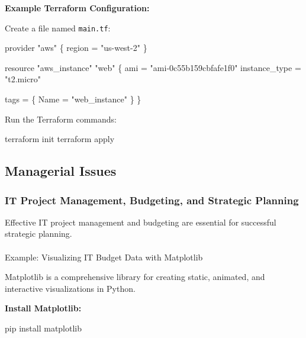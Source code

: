 \documentclass[
  letterpaper,
  DIV=11,
  numbers=noendperiod]{scrreprt}
\makeatletter
\let\oldparagraph\paragraph
\renewcommand{\paragraph}{
    \@ifstar
      \xxxParagraphStar
      \xxxParagraphNoStar
  }
\newcommand{\xxxParagraphStar}[1]{\oldparagraph*{#1}\mbox{}}
\newcommand{\xxxParagraphNoStar}[1]{\oldparagraph{#1}\mbox{}}
\newenvironment{Shaded}{\begin{snugshade}}{\end{snugshade}}
\newcommand{\ExtensionTok}[1]{\textcolor[rgb]{0.00,0.23,0.31}{#1}}
\newcommand{\NormalTok}[1]{\textcolor[rgb]{0.00,0.23,0.31}{#1}}
\makeatother
\begin{document}
\textbf{Example Terraform Configuration:}

Create a file named \texttt{main.tf}:

\begin{Shaded}
\begin{Highlighting}[]
\NormalTok{provider "aws" \{}
\NormalTok{  region = "us{-}west{-}2"}
\NormalTok{\}}

\NormalTok{resource "aws\_instance" "web" \{}
\NormalTok{  ami           = "ami{-}0c55b159cbfafe1f0"}
\NormalTok{  instance\_type = "t2.micro"}

\NormalTok{  tags = \{}
\NormalTok{    Name = "web\_instance"}
\NormalTok{  \}}
\NormalTok{\}}
\end{Highlighting}
\end{Shaded}

Run the Terraform commands:

\begin{Shaded}
\begin{Highlighting}[]
\ExtensionTok{terraform}\NormalTok{ init}
\ExtensionTok{terraform}\NormalTok{ apply}
\end{Highlighting}
\end{Shaded}

\subsection{Managerial Issues}\label{managerial-issues}

\subsubsection{IT Project Management, Budgeting, and Strategic
Planning}\label{it-project-management-budgeting-and-strategic-planning}

Effective IT project management and budgeting are essential for
successful strategic planning.

\paragraph{Example: Visualizing IT Budget Data with
Matplotlib}\label{example-visualizing-it-budget-data-with-matplotlib}

Matplotlib is a comprehensive library for creating static, animated, and
interactive visualizations in Python.

\textbf{Install Matplotlib:}

\begin{Shaded}
\begin{Highlighting}[]
\ExtensionTok{pip}\NormalTok{ install matplotlib}
\end{Highlighting}
\end{Shaded}
\end{document}
